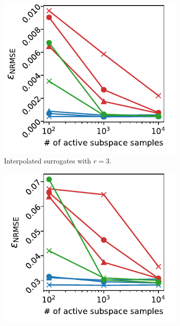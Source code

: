 \documentclass[
  a4paper,  %
  twoside,  %
  bibliography=totoc,
  headsepline,
  cleardoublepage=empty,
  parskip=half,
  draft=false
]{scrbook}
\begin{document}
\begin{mdframed}[style=style]
\begin{figure}[H]
\begin{subfigure}{.5\textwidth}
  \centering
   \includegraphics[width=\linewidth]{graphics/ishigami_as_3_inter}
	\caption{Interpolated surrogates with $r=3$.}
	\label{fig:ishigami_as_3_inter}
\end{subfigure}
\begin{subfigure}{.5\textwidth}
  \centering
   \includegraphics[width=\linewidth]{graphics/ishigami_as_3}

\end{subfigure}
\end{figure}
\end{mdframed}
\end{document}
